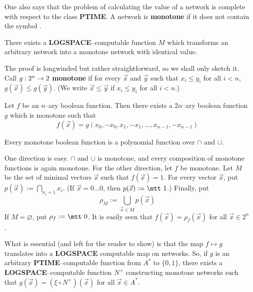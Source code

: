 One also says that the problem of calculating the value of a 
network is complete with respect to the class \textbf{PTIME}.
A network is \textbf{monotone} 
if it does not contain the symbol {\mtt{}}.
\begin{thm}
There exists a \textbf{LOGSPACE}--computable function $M$
which transforms an arbitrary network into a monotone
network with identical value.
\end{thm}
The proof is longwinded but rather straightforward, so we shall
only sketch it. Call $g : 2^n \rightarrow 2$ \textbf{monotone} 
if for every $\vec{x}$ and $\vec{y}$ such that $x_i \leq y_i$ for all 
$i < n$, $g(\vec{x}) \leq g(\vec{y})$. (We write 
$\vec{x} \leq \vec{y}$ if $x_i \leq y_i$ for all $i < n$.)
\begin{lem}
\label{lem:monotone}
Let $f$ be an $n$--ary boolean function. Then there exists a 
$2n$--ary boolean function $g$ which is monotone such that 
\begin{equation}
f(\vec{x}) = g(x_0, - x_0, x_1, - x_1, \dotsc, x_{n-1}, -x_{n-1})
\end{equation}
\end{lem}
\begin{thm}
Every monotone boolean function is a polynomial function over 
$\cap$ and $\cup$.
\end{thm}
\proofbeg
One direction is easy. $\cap$ and $\cup$ is monotone, and 
every composition of monotone functions is again monotone. 
For the other direction, let $f$ be monotone. Let $M$ be 
the set of minimal vectors $\vec{x}$ such that $f(\vec{x}) = 1$.
For every vector $\vec{x}$, put $p(\vec{x}) := 
\bigcap_{x_i = 1} x_i$. (If $\vec{x} = 0\dotsc 0$, then 
$p(\vec{x}) := \mbox{\mtt 1}$.) Finally, put 
\begin{equation}
\rho_M := \bigcup_{\vec{x} \in M} p(\vec{x})
\end{equation}
If $M = \varnothing$, put $\rho_f := \mbox{\mtt 0}$. It is easily 
seen that $f(\vec{x}) = \rho_f(\vec{x})$ for all $\vec{x} \in 2^n$.
\proofend

What is essential (and left for the reader to show) is that 
the map $f \mapsto g$ translates into a \textbf{LOGSPACE} 
computable map on networks. So, if $g$ is an arbitrary 
\textbf{PTIME}--computable function from $A^{\ast}$ to $\{0,1\}$, 
there exists a \textbf{LOGSPACE}--computable function $N^+$
constructing monotone networks such that $g(\vec{x}) = 
(\xi \circ N^+)(\vec{x})$ for all $\vec{x} \in A^{\ast}$.

